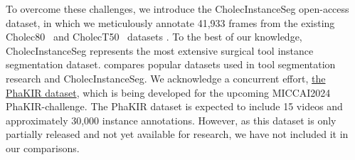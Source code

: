 To overcome these challenges, we introduce the CholecInstanceSeg open-access dataset, in which we meticulously annotate 41,933 frames from the existing Cholec80~\cite{EndoNet} and CholecT50~\cite{NWOYE2022102433_rendevous} datasets .
To the best of our knowledge,
CholecInstanceSeg represents the most extensive surgical tool instance segmentation dataset.
 compares popular datasets used in tool segmentation research and CholecInstanceSeg. We acknowledge a concurrent effort, \href{https://phakir.re-mic.de/data/}{the PhaKIR dataset}, which is being developed for the upcoming MICCAI2024 PhaKIR-challenge. The PhaKIR dataset is expected to include 15 videos and approximately 30,000 instance annotations. However, as this dataset is only partially released and not yet available for research, we have not included it in our comparisons.

